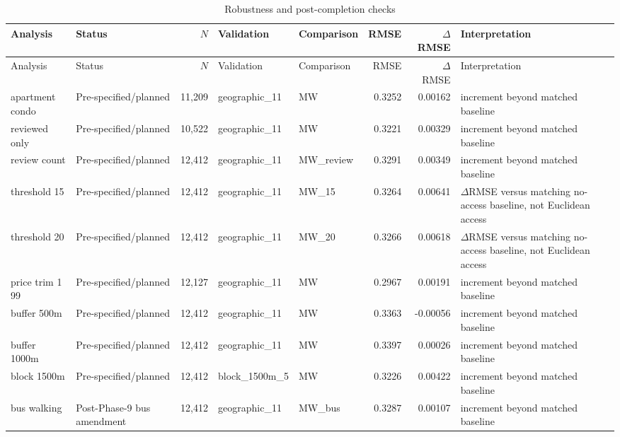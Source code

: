 \begin{landscape}
\small
\begin{longtable}{>{\raggedright\arraybackslash}p{3.0cm}>{\raggedright\arraybackslash}p{2.9cm}r>{\raggedright\arraybackslash}p{2.7cm}>{\raggedright\arraybackslash}p{3.1cm}rr>{\raggedright\arraybackslash}p{6.7cm}}
\caption{Robustness and post-completion checks}\label{tab:robustness}\\
\toprule
Analysis & Status & $N$ & Validation & Comparison & RMSE & $\Delta$ RMSE & Interpretation \\
\midrule
\endfirsthead
\toprule
Analysis & Status & $N$ & Validation & Comparison & RMSE & $\Delta$ RMSE & Interpretation \\
\midrule
\endhead
apartment condo & Pre-specified/planned & 11,209 & geographic\_\allowbreak{}11 & MW & 0.3252 & 0.00162 & increment beyond matched baseline \\
reviewed only & Pre-specified/planned & 10,522 & geographic\_\allowbreak{}11 & MW & 0.3221 & 0.00329 & increment beyond matched baseline \\
review count & Pre-specified/planned & 12,412 & geographic\_\allowbreak{}11 & MW\_\allowbreak{}review & 0.3291 & 0.00349 & increment beyond matched baseline \\
threshold 15 & Pre-specified/planned & 12,412 & geographic\_\allowbreak{}11 & MW\_\allowbreak{}15 & 0.3264 & 0.00641 & $\Delta$RMSE versus matching no-access baseline, not Euclidean access \\
threshold 20 & Pre-specified/planned & 12,412 & geographic\_\allowbreak{}11 & MW\_\allowbreak{}20 & 0.3266 & 0.00618 & $\Delta$RMSE versus matching no-access baseline, not Euclidean access \\
price trim 1 99 & Pre-specified/planned & 12,127 & geographic\_\allowbreak{}11 & MW & 0.2967 & 0.00191 & increment beyond matched baseline \\
buffer 500m & Pre-specified/planned & 12,412 & geographic\_\allowbreak{}11 & MW & 0.3363 & -0.00056 & increment beyond matched baseline \\
buffer 1000m & Pre-specified/planned & 12,412 & geographic\_\allowbreak{}11 & MW & 0.3397 & 0.00026 & increment beyond matched baseline \\
block 1500m & Pre-specified/planned & 12,412 & block\_\allowbreak{}1500m\_\allowbreak{}5 & MW & 0.3226 & 0.00422 & increment beyond matched baseline \\
bus walking & Post-Phase-9 bus amendment & 12,412 & geographic\_\allowbreak{}11 & MW\_\allowbreak{}bus & 0.3287 & 0.00107 & increment beyond matched baseline \\

\end{longtable}
\end{landscape}
